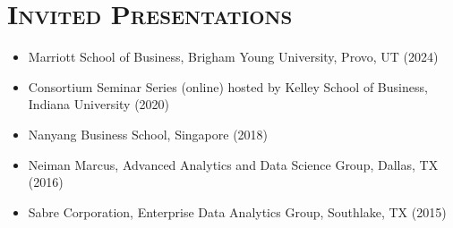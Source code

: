 \documentclass[11pt]{article}
\begin{document}
			\section*{\textbf{\textsc{Invited Presentations}}}
			\begin{itemize}
				\item  Marriott School of Business, Brigham Young University, Provo, UT (2024)
				\item Consortium Seminar Series (online) hosted by Kelley School of Business, Indiana University (2020)
				\item  Nanyang Business School, Singapore (2018)
				\item Neiman Marcus, Advanced Analytics and Data Science Group, Dallas, TX (2016)
				\item Sabre Corporation,  Enterprise Data Analytics Group, Southlake, TX (2015)
			\end{itemize}
\end{document}
